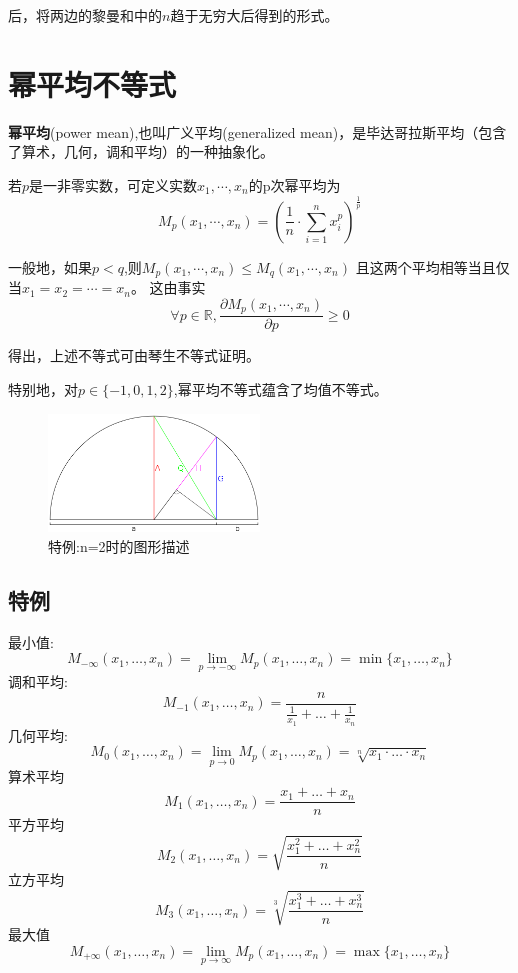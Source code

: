 \documentclass[a4paper]{article} %
\numberwithin{equation}{section} %
\begin{document}
后，将两边的黎曼和中的$n$趋于无穷大后得到的形式。

\section{幂平均不等式}

\textbf{幂平均}(power mean),也叫广义平均(generalized mean)，是毕达哥拉斯平均（包含了算术，几何，调和平均）的一种抽象化。

若$p$是一非零实数，可定义实数$x_1,\cdots,x_n$的p次幂平均为
\begin{equation}
M_p(x_1,\cdots,x_n)=\left(\frac{1}{n}\cdot\sum_{i=1}^n x_i^p\right )^{\frac{1}{p}} 
\end{equation}

一般地，如果$p<q$,则$M_p(x_1,\cdots,x_n)\le M_q(x_1,\cdots,x_n)$ 且这两个平均相等当且仅当$x_1=x_2=\cdots=x_n$。 这由事实
\begin{equation}
\forall p\in\mathbb{R}, \frac{\partial M_p(x_1,\cdots,x_n)}{\partial p}\ge 0
\end{equation}

得出，上述不等式可由琴生不等式证明。

特别地，对$p\in\{-1,0,1,2\}$,幂平均不等式蕴含了均值不等式。

\begin{figure}[htbp]
\centering
\includegraphics[width=0.5\textwidth]{mean.png}
\caption{特例:n=2时的图形描述}
\end{figure}

\subsection{特例}
最小值:
$$
M_{-\infty}(x_{1},\dots,x_{n})=\lim_{p\to -\infty }M_{p}(x_{1},\dots ,x_{n})=\min\{x_{1},\dots ,x_{n}\}
$$	
调和平均:
$$ 
M_{-1}(x_{1},\dots ,x_{n})=\frac{n}{\frac{1}{x_{1}}+\dots +\frac{1}{x_{n}}}
$$
几何平均:
$$
M_{0}(x_{1},\dots ,x_{n})=\lim_{p\to 0}M_{p}(x_{1},\dots ,x_{n})=\sqrt[n]{x_{1}\cdot \dots \cdot x_{n}}	
$$
算术平均
$$
M_{1}(x_{1},\dots ,x_{n})=\frac{x_{1}+\dots +x_{n}}{n}
$$
平方平均
$$ M_{2}(x_{1},\dots ,x_{n})=\sqrt{\frac{x_{1}^{2}+\dots +x_{n}^{2}}{n}}
$$
立方平均	
$$ M_{3}(x_{1},\dots ,x_{n})=\sqrt[{3}]{\frac {x_{1}^{3}+\dots +x_{n}^{3}}{n}}$$	
最大值
$$ M_{+\infty }(x_{1},\dots ,x_{n})=\lim _{p\to \infty }M_{p}(x_{1},\dots ,x_{n})=\max\{x_{1},\dots ,x_{n}\}$$
\end{document}
